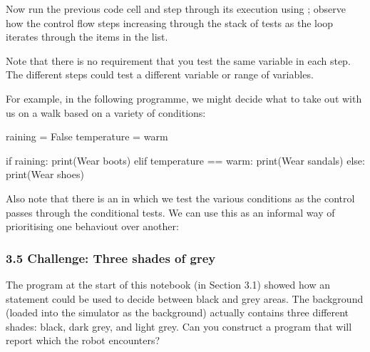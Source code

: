 \documentclass[letterpaper,10pt,english]{sphinxmanual}
\begin{document}
Now run the previous code cell and step through its execution using ; observe how the control flow steps increasing through the stack of  tests as the  loop iterates through the items in the  list.

Note that there is no requirement that you test the same variable in each step. The different steps could test a different variable or range of variables.

For example, in the following programme, we might decide what to take out with us on a walk based on a variety of conditions:

{
\begin{sphinxVerbatim}[commandchars=\\\{\}]
\llap{\color{nbsphinxin}[ ]:\,\hspace{\fboxrule}\hspace{\fboxsep}}raining = False
temperature = \PYGZsq{}warm\PYGZsq{}

if raining:
    print(\PYGZdq{}Wear boots\PYGZdq{})
elif temperature == \PYGZsq{}warm\PYGZsq{}:
    print(\PYGZdq{}Wear sandals\PYGZdq{})
else:
    print(\PYGZdq{}Wear shoes\PYGZdq{})
\end{sphinxVerbatim}
}

Also note that there is an  in which we test the various conditions as the control passes through the  conditional tests. We can use this as an informal way of prioritising one behaviout over another:

\begin{sphinxVerbatim}[commandchars=\\\{\}]
 
 
  
\end{sphinxVerbatim}


\subsubsection{3.5 Challenge: Three shades of grey}
\label{\detokenize{content/02_Robot_Lab/Section_00_02:3.5-Challenge:-Three-shades-of-grey}}
The program at the start of this notebook (in Section 3.1) showed how an  statement could be used to decide between black and grey areas. The background (loaded into the simulator as the  background) actually contains three different shades: black, dark grey, and light grey. Can you construct a program that will report which the robot encounters?
\end{document}
